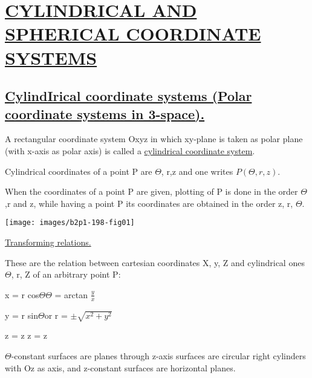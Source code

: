 \documentclass[11pts]{amsbook}
\begin{document}
\section{\underline{CYLINDRICAL AND SPHERICAL COORDINATE SYSTEMS}}
\subsection{\underline{CylindIrical coordinate systems (Polar coordinate systems in 3-space).}}
\begin{minipage}{0.55\textwidth}

\qquad A rectangular coordinate system Oxyz in which xy-plane is taken as polar plane (with x-axis as polar axis) is called a
\underline{cylindrical coordinate system}.

\qquad Cylindrical coordinates of a
point P are $\Theta$, r,z and one writes $P(\Theta, r, z).$

\qquad When the coordinates of a point P are given, plotting of
P is done in the order $\Theta$,r and z, while having a point P its coordinates are obtained in the order z, r, $\Theta$.

\end{minipage}
\begin{minipage}{0.45\textwidth}
\texttt{[image: images/b2p1-198-fig01]}
\end{minipage}

\qquad \underline{Transforming relations.}

\qquad These are the relation between cartesian coordinates
X, y, Z and cylindrical ones $\Theta$, r, Z of an arbitrary point P:

\qquad x = r cos$\Theta$\qquad \qquad \qquad $\Theta$ =  arctan $\frac{y}{x}$

\qquad y =  r  sin$\Theta$\qquad or \qquad r =  $ \pm \sqrt{x^2+y^2}$

\qquad z = z \qquad \qquad \qquad z = z

\qquad $\Theta$-constant surfaces are planes through z-axis surfaces are circular right cylinders with Oz as axis, and z-constant surfaces are horizontal planes.
\end{document}

